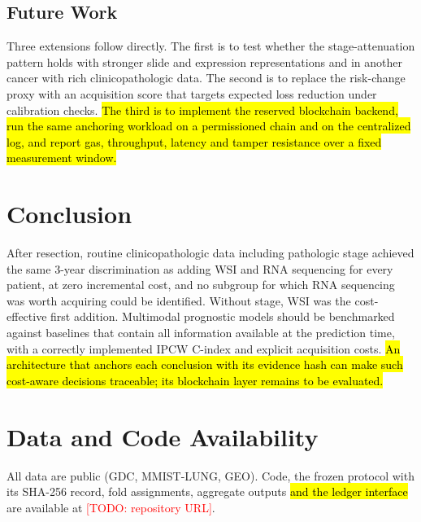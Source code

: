\documentclass[journal,twoside,web]{IEEEtran}
\newcommand{\bc}[1]{\hl{#1}}
\newcommand{\bc}[1]{#1}
\newcommand{\todo}[1]{\textcolor{red}{[TODO: #1]}}
\begin{document}
\subsection{Future Work}
Three extensions follow directly. The first is to test whether the stage-attenuation pattern holds with stronger slide and expression representations and in another cancer with rich clinicopathologic data. The second is to replace the risk-change proxy with an acquisition score that targets expected loss reduction under calibration checks. \bc{The third is to implement the reserved blockchain backend, run the same anchoring workload on a permissioned chain and on the centralized log, and report gas, throughput, latency and tamper resistance over a fixed measurement window.}

\section{Conclusion}
After resection, routine clinicopathologic data including pathologic stage achieved the same 3-year discrimination as adding WSI and RNA sequencing for every patient, at zero incremental cost, and no subgroup for which RNA sequencing was worth acquiring could be identified. Without stage, WSI was the cost-effective first addition. Multimodal prognostic models should be benchmarked against baselines that contain all information available at the prediction time, with a correctly implemented IPCW C-index and explicit acquisition costs. \bc{An architecture that anchors each conclusion with its evidence hash can make such cost-aware decisions traceable; its blockchain layer remains to be evaluated.}

\section*{Data and Code Availability}
All data are public (GDC, MMIST-LUNG, GEO). Code, the frozen protocol with its SHA-256 record, fold assignments, aggregate outputs \bc{and the ledger interface} are available at \todo{repository URL}.



\end{document}
